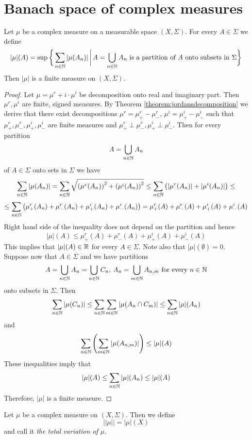 \section{Banach space of complex measures}

\begin{proposition}\label{proposition:variationismeasure}
Let $\mu$ be a complex measure on a measurable space $(X,\Sigma)$. For every $A\in \Sigma$ we define
$$|\mu|(A) = \sup \bigg\{\sum_{n\in {\mathbb N}}|\mu(A_n)|\,\bigg|\,A = \bigcup_{n\in {\mathbb N}}A_n\mbox{ is a partition of }A\mbox{ onto subsets in }\Sigma\bigg\}$$
Then $|\mu|$ is a finite measure on $(X,\Sigma)$.
\end{proposition}
\begin{proof}
Let $\mu = \mu^r + i\cdot \mu^i$ be decomposition onto real and imaginary part. Then $\mu^r,\mu^i$ are finite, signed measures. By Theorem \ref{theorem:jordansdecomposition} we derive that there exist decompositions $\mu^r = \mu^r_+ - \mu^r_-$, $\mu^i = \mu^i_+ - \mu^i_-$ such that $\mu^r_+,\mu^r_-,\mu^i_+,\mu^i_-$ are finite measures and $\mu^r_+\perp \mu^r_-,\mu^i_+\perp \mu^i_-$. Then for every partition
$$A = \bigcup_{n\in {\mathbb N}}A_n$$
of $A \in \Sigma$ onto sets in $\Sigma$ we have
$$\sum_{n\in {\mathbb N}}|\mu(A_n)| = \sum_{n\in {\mathbb N}}\sqrt{\left(\mu^r(A_n)\right)^2 + \left(\mu^i(A_n)\right)^2} \leq \sum_{n\in {\mathbb N}}\left(|\mu^r(A_n)| + |\mu^i(A_n)|\right) \leq$$
$$\leq \sum_{n\in {\mathbb N}}\left(\mu^r_+(A_n)+\mu^r_-(A_n) + \mu^i_+(A_n) + \mu^i_-(A_n)\right) =\mu^r_+(A)+\mu^r_-(A) + \mu^i_+(A) + \mu^i_-(A)$$
Right hand side of the inequality does not depend on the partition and hence
$$|\mu|(A) \leq \mu^r_+(A)+\mu^r_-(A) + \mu^i_+(A) + \mu^i_-(A)$$
This implies that $|\mu|(A)\in {\mathbb R}$ for every $A\in \Sigma$. Note also that $|\mu|(\emptyset)=0$. Suppose now that $A\in \Sigma$ and we have partitions
$$A = \bigcup_{n\in {\mathbb N}}A_{n} = \bigcup_{n\in {\mathbb N}}C_n,\,A_n = \bigcup_{m\in {\mathbb N}}A_{n,m}\mbox{ for every }n\in {\mathbb N}$$
onto subsets in $\Sigma$. Then
$$\sum_{n\in {\mathbb N}}|\mu(C_n)| \leq \sum_{n\in {\mathbb N}}\sum_{m\in {\mathbb N}}|\mu(A_n\cap C_m)|\leq \sum_{n\in {\mathbb N}}|\mu|(A_n)$$
and
$$\sum_{n\in {\mathbb N}}\left(\sum_{m\in {\mathbb N}}|\mu(A_{n,m})|\right)\leq |\mu|(A)$$
These inequalities imply that
$$|\mu|(A) \leq \sum_{n\in {\mathbb N}}|\mu|(A_n)\leq |\mu|(A)$$
Therefore, $|\mu|$ is a finite measure.
\end{proof}

\begin{definition}
Let $\mu$ be a complex measure on $(X,\Sigma)$. Then we define
$$||\mu|| = |\mu|(X)$$
and call it \textit{the total variation of $\mu$}.
\end{definition}

